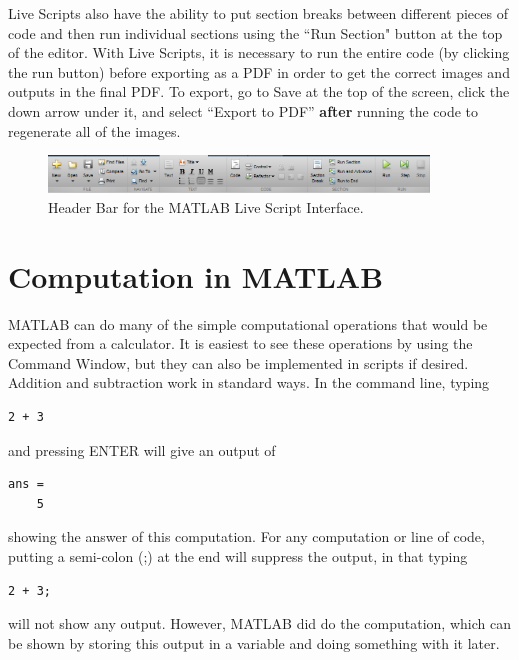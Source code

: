 \documentclass{ximera}
\begin{document}
Live Scripts also have the ability to put section breaks between different pieces of code and then run individual sections using the ``Run Section" button at the top of the editor. With Live Scripts, it is necessary to run the entire code (by clicking the run button) before exporting as a PDF in order to get the correct images and outputs in the final PDF. To export, go to Save at the top of the screen, click the down arrow under it, and select ``Export to PDF'' \textbf{after} running the code to regenerate all of the images.

\begin{figure}[h]
    \centering
    \includegraphics[width=0.9\textwidth]{figures/MatlabLiveScript_HeaderBar.png}
    \caption{Header Bar for the MATLAB Live Script Interface.}
    \label{fig:MatlabDemo_LSHead}
\end{figure}

\section{Computation in MATLAB}

MATLAB can do many of the simple computational operations that would be expected from a calculator. It is easiest to see these operations by using the Command Window, but they can also be implemented in scripts if desired. Addition and subtraction work in standard ways. In the command line, typing
\begin{verbatim}
2 + 3
\end{verbatim}%
\noindent and pressing ENTER will give an output of
\begin{verbatim}
ans = 
    5
\end{verbatim}
showing the answer of this computation. For any computation or line of code, putting a semi-colon (;) at the end will suppress the output, in that typing
\begin{verbatim}
2 + 3;
\end{verbatim}
will not show any output. However, MATLAB did do the computation, which can be shown by storing this output in a variable and doing something with it later. 
\end{document}
